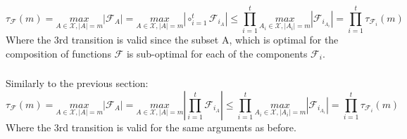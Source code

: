 \subsubsection{}
\begin{equation*}
    \tau_\mathcal{F}(m) = \underset{A\in \mathcal{X},|A|=m}{max}|\mathcal{F}_A| 
    = \underset{A\in \mathcal{X},|A|=m}{max}|\circ_{i=1}^t\mathcal{F}_{i_A}| 
    \leq \prod_{i=1}^t \underset{A_i\in \mathcal{X},|A_i|=m}{max}|\mathcal{F}_{i_{A_i}}|
    = \prod_{i=1}^t \tau_{\mathcal{F}_i}(m)
\end{equation*}
Where the 3rd transition is valid since the subset A, which is optimal for the composition of functions $\mathcal{F}$ is sub-optimal for each of the components $\mathcal{F}_i$.

\subsubsection{}
Similarly to the previous section:
\begin{equation*}
    \tau_\mathcal{F}(m) = \underset{A\in \mathcal{X},|A|=m}{max}|\mathcal{F}_A| 
    = \underset{A\in \mathcal{X},|A|=m}{max}|\prod_{i=1}^t\mathcal{F}_{i_A}| 
    \leq \prod_{i=1}^t \underset{A_i\in \mathcal{X},|A_i|=m}{max}|\mathcal{F}_{i_{A_i}}|
    = \prod_{i=1}^t \tau_{\mathcal{F}_i}(m)
\end{equation*}
Where the 3rd transition is valid for the same arguments as before.